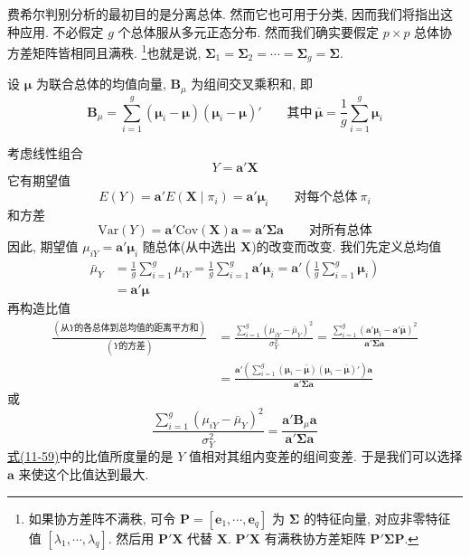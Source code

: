 
费希尔判别分析的最初目的是分离总体. 然而它也可用于分类, 因而我们将指出这种应用. 不必假定 $g$ 个总体服从多元正态分布. 然而我们确实要假定 $p\times p$ 总体协方差矩阵皆相同且满秩. \footnote{如果协方差阵不满秩, 可令 $\mathbf{P}=[\mathbf{e}_1,\cdots,\mathbf{e}_q]$ 为 $\boldsymbol{\Sigma}$ 的特征向量, 对应非零特征值 $[\lambda_1,\cdots,\lambda_q]$. 然后用 $\mathbf{P}'\mathbf{X}$ 代替 $\mathbf{X}$. $\mathbf{P}'\mathbf{X}$ 有满秩协方差矩阵 $\mathbf{P}'\boldsymbol{\Sigma}\mathbf{P}$.}也就是说, $\boldsymbol{\Sigma}_1=\boldsymbol{\Sigma}_2=\cdots=\boldsymbol{\Sigma}_g=\boldsymbol{\Sigma}$.

设 $\boldsymbol{\mu}$ 为联合总体的均值向量, $\mathbf{B}_\mu$ 为组间交叉乘积和, 即
\label{eq:11-58}
\begin{equation}
\mathbf{B}_\mu=\sum_{i=1}^{g}(\boldsymbol{\mu}_i-\boldsymbol{\mu})(\boldsymbol{\mu}_i-\boldsymbol{\mu})'\qquad \text{其中}\ \bar{\boldsymbol{\mu}}=\frac{1}{g}\sum_{i=1}^{g}\boldsymbol{\mu}_i
\tag{11-58}
\end{equation}

考虑线性组合
\[
Y=\mathbf{a}'\mathbf{X}
\]
它有期望值
\[
E(Y)=\mathbf{a}'E(\mathbf{X}\mid \pi_i)=\mathbf{a}'\boldsymbol{\mu}_i\qquad \text{对每个总体}\ \pi_i
\]
和方差
\[
\mathrm{Var}(Y)=\mathbf{a}'\mathrm{Cov}(\mathbf{X})\mathbf{a}=\mathbf{a}'\boldsymbol{\Sigma}\mathbf{a}\qquad \text{对所有总体}
\]
因此, 期望值 $\mu_{iY}=\mathbf{a}'\boldsymbol{\mu}_i$ 随总体(从中选出 $\mathbf{X}$)的改变而改变. 我们先定义总均值
\[
\begin{aligned}
\bar{\mu}_Y&=\frac{1}{g}\sum_{i=1}^{g}\mu_{iY}=\frac{1}{g}\sum_{i=1}^{g}\mathbf{a}'\boldsymbol{\mu}_i=\mathbf{a}'\left(\frac{1}{g}\sum_{i=1}^{g}\boldsymbol{\mu}_i\right)\\
&=\mathbf{a}'\boldsymbol{\mu}
\end{aligned}
\]
再构造比值
\[
\begin{aligned}
\frac{(\text{从} Y \text{的各总体到总均值的距离平方和})}{(Y\text{的方差})}&=\frac{\sum\limits_{i=1}^{g}(\mu_{iY}-\bar{\mu}_Y)^2}{\sigma_Y^2}=\frac{\sum\limits_{i=1}^{g}(\mathbf{a}'\boldsymbol{\mu}_i-\mathbf{a}'\bar{\boldsymbol{\mu}})^2}{\mathbf{a}'\boldsymbol{\Sigma}\mathbf{a}}\\
&=\frac{\mathbf{a}'\left(\sum\limits_{i=1}^{g}(\boldsymbol{\mu}_i-\bar{\boldsymbol{\mu}})(\boldsymbol{\mu}_i-\bar{\boldsymbol{\mu}})'\right)\mathbf{a}}{\mathbf{a}'\boldsymbol{\Sigma}\mathbf{a}}
\end{aligned}
\]
或
\label{eq:11-59}
\begin{equation}
\frac{\sum\limits_{i=1}^{g}(\mu_{iY}-\bar{\mu}_Y)^2}{\sigma_Y^2}=\frac{\mathbf{a}'\mathbf{B}_\mu\mathbf{a}}{\mathbf{a}'\boldsymbol{\Sigma}\mathbf{a}}
\tag{11-59}
\end{equation}
\hyperref[eq:11-59]{式(11-59)}中的比值所度量的是 $Y$ 值相对其组内变差的组间变差. 于是我们可以选择 $\mathbf{a}$ 来使这个比值达到最大.

